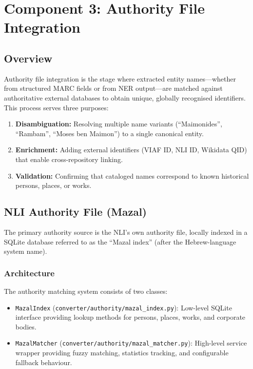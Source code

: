 \documentclass[12pt]{article}
\newcommand{\filepath}[1]{\texttt{\small #1}}
\newcommand{\code}[1]{\texttt{#1}}
\begin{document}
\section{Component 3: Authority File Integration}
\label{sec:authority}

\subsection{Overview}

Authority file integration is the stage where extracted entity names---whether from structured MARC fields or from NER output---are matched against authoritative external databases to obtain unique, globally recognised identifiers. This process serves three purposes:

\begin{enumerate}
\item \textbf{Disambiguation:} Resolving multiple name variants (``Maimonides'', ``Rambam'', ``Moses ben Maimon'') to a single canonical entity.
\item \textbf{Enrichment:} Adding external identifiers (VIAF ID, NLI ID, Wikidata QID) that enable cross-repository linking.
\item \textbf{Validation:} Confirming that cataloged names correspond to known historical persons, places, or works.
\end{enumerate}

\subsection{NLI Authority File (Mazal)}

The primary authority source is the NLI's own authority file, locally indexed in a SQLite database referred to as the ``Mazal index'' (after the Hebrew-language system name).

\subsubsection{Architecture}

The authority matching system consists of two classes:

\begin{itemize}
\item \code{MazalIndex} (\filepath{converter/authority/mazal\_index.py}): Low-level SQLite interface providing lookup methods for persons, places, works, and corporate bodies.
\item \code{MazalMatcher} (\filepath{converter/authority/mazal\_matcher.py}): High-level service wrapper providing fuzzy matching, statistics tracking, and configurable fallback behaviour.
\end{itemize}
\end{document}
